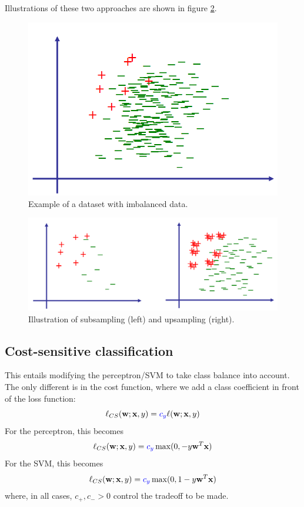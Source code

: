 \documentclass[a4paper,10pt,twoside]{article}
\begin{document}
Illustrations of these two approaches are shown in figure \ref{up_and_downsampling}.

\begin{figure}
    \centering
    \includegraphics[width=.5\textwidth]{figures/imbalanced_data.png}
    \caption{Example of a dataset with imbalanced data.}
    \label{imbalanced_data}
\end{figure}

\begin{figure}
    \centering
    \includegraphics[width=.5\textwidth]{figures/up_and_down_sampling.png}
    \caption{Illustration of subsampling (left) and upsampling (right).}
    \label{up_and_downsampling}
\end{figure}

\subsection{Cost-sensitive classification}

This entails modifying the perceptron/SVM to take class balance into account. The only different is in the cost function, where we add a class coefficient in front of the loss function:
\begin{equation*}
    \ell_{CS}(\mathbf{w};\mathbf{x},y)=\color{blue}c_y\color{black}\ell(\mathbf{w};\mathbf{x},y)
\end{equation*}
For the perceptron, this becomes
\begin{equation*}
    \ell_{CS}(\mathbf{w};\mathbf{x},y)=\color{blue}c_y\color{black}\max(0,-y\mathbf{w}^T\mathbf{x})
\end{equation*}
For the SVM, this becomes
\begin{equation*}
    \ell_{CS}(\mathbf{w};\mathbf{x},y)=\color{blue}c_y\color{black}\max(0,1-y\mathbf{w}^T\mathbf{x})
\end{equation*}
where, in all cases, $c_+, c_->0$ control the tradeoff to be made.
\end{document}
